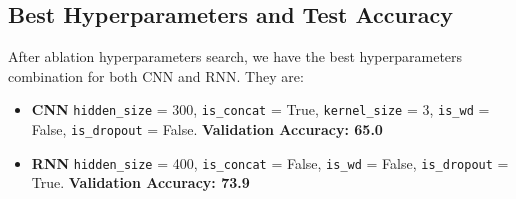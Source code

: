 \documentclass[10pt,a4paper]{article}
\begin{document}
\subsection{Best Hyperparameters and Test Accuracy}
After ablation hyperparameters search, we have the best hyperparameters combination for both CNN and RNN. They are:
\begin{itemize}
\item \textbf{CNN}	\texttt{hidden\_size} = 300, \texttt{is\_concat} = True, \texttt{kernel\_size} = 3, \texttt{is\_wd} = False, \texttt{is\_dropout} = False. \textbf{Validation Accuracy: 65.0}  
\item \textbf{RNN}	\texttt{hidden\_size} = 400, \texttt{is\_concat} = False,  \texttt{is\_wd} = False, \texttt{is\_dropout} = True. \textbf{Validation Accuracy: 73.9}  
\end{itemize}
 
\end{document}
